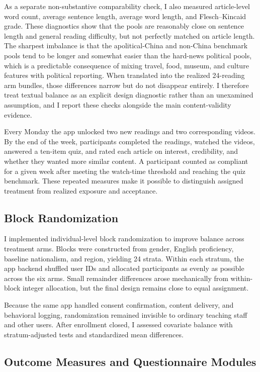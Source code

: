 \documentclass[12pt,american]{article}
\begin{document}
As a separate non-substantive comparability check, I also measured article-level word count, average sentence length, average word length, and Flesch--Kincaid grade. These diagnostics show that the pools are reasonably close on sentence length and general reading difficulty, but not perfectly matched on article length. The sharpest imbalance is that the apolitical-China and non-China benchmark pools tend to be longer and somewhat easier than the hard-news political pools, which is a predictable consequence of mixing travel, food, museum, and culture features with political reporting. When translated into the realized 24-reading arm bundles, those differences narrow but do not disappear entirely. I therefore treat textual balance as an explicit design diagnostic rather than an unexamined assumption, and I report these checks alongside the main content-validity evidence.

Every Monday the app unlocked two new readings and two corresponding videos. By the end of the week, participants completed the readings, watched the videos, answered a ten-item quiz, and rated each article on interest, credibility, and whether they wanted more similar content. A participant counted as compliant for a given week after meeting the watch-time threshold and reaching the quiz benchmark. These repeated measures make it possible to distinguish assigned treatment from realized exposure and acceptance.

\subsection{Block Randomization}

I implemented individual-level block randomization to improve balance across treatment arms. Blocks were constructed from gender, English proficiency, baseline nationalism, and region, yielding 24 strata. Within each stratum, the app backend shuffled user IDs and allocated participants as evenly as possible across the six arms. Small remainder differences arose mechanically from within-block integer allocation, but the final design remains close to equal assignment.

Because the same app handled consent confirmation, content delivery, and behavioral logging, randomization remained invisible to ordinary teaching staff and other users. After enrollment closed, I assessed covariate balance with stratum-adjusted tests and standardized mean differences.

\subsection{Outcome Measures and Questionnaire Modules}
\end{document}
